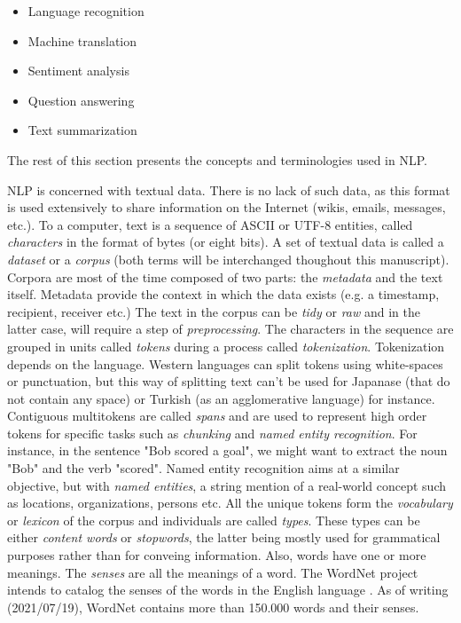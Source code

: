 \begin{itemize}
    \item Language recognition
    \item Machine translation
    \item Sentiment analysis
    \item Question answering
    \item Text summarization
\end{itemize}
The rest of this section presents the concepts and terminologies used in NLP.

NLP is concerned with textual data.
There is no lack of such data, as this format is used extensively to share information on the Internet (wikis, emails, messages, etc.).
To a computer, text is a sequence of ASCII or UTF-8 entities, called \emph{characters} in the format of bytes (or eight bits).
A set of textual data is called a \emph{dataset} or a \emph{corpus} (both terms will be interchanged thoughout this manuscript).
Corpora are most of the time composed of two parts: the \emph{metadata} and the text itself.
Metadata provide the context in which the data exists (e.g. a timestamp, recipient, receiver etc.)
The text in the corpus can be \emph{tidy} or \emph{raw} and in the latter case, will require a step of \emph{preprocessing}.
The characters in the sequence are grouped in units called \emph{tokens} during a process called \emph{tokenization}.
Tokenization depends on the language.
Western languages can split tokens using white-spaces or punctuation, but this way of splitting text can't be used for Japanase (that do not contain any space) or Turkish (as an agglomerative language) for instance.
Contiguous multitokens are called \emph{spans} and are used to represent high order tokens for specific tasks such as \emph{chunking} and \emph{named entity recognition}.
For instance, in the sentence "Bob scored a goal", we might want to extract the noun "Bob" and the verb "scored".
Named entity recognition aims at a similar objective, but with \emph{named entities}, a string mention of a real-world concept such as locations, organizations, persons etc.
All the unique tokens form the \emph{vocabulary} or \emph{lexicon} of the corpus and individuals are called \emph{types}.
These types can be either \emph{content words} or \emph{stopwords}, the latter being mostly used for grammatical purposes rather than for conveing information.
Also, words have one or more meanings.
The \emph{senses} are all the meanings of a word.
The WordNet project intends to catalog the senses of the words in the English language \parencite{millerWordNetLexicalDatabase1995}.
As of writing (2021/07/19), WordNet contains more than 150.000 words and their senses.

